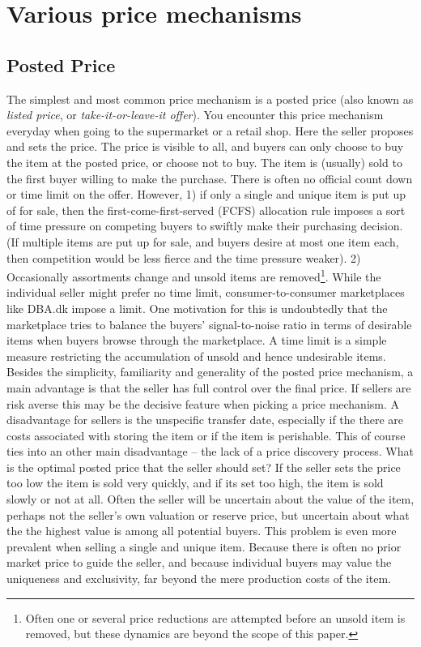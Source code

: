 \documentclass[a4paper,12pt]{article}
\begin{document}
	\section{Various price mechanisms}

	\subsection{Posted Price}
	The simplest and most common price mechanism is a posted price (also known as {\it listed price}, or {\it take-it-or-leave-it offer}). You encounter this price mechanism everyday when going to the supermarket or a retail shop. Here the seller proposes and sets the price. The price is visible to all, and buyers can only choose to buy the item at the posted price, or choose not to buy. The item is (usually) sold to the first buyer willing to make the purchase. There is often no official count down or time limit on the offer. However, 1) if only a single and unique item is put up of for sale, then the first-come-first-served (FCFS) allocation rule imposes a sort of time pressure on competing buyers to swiftly make their purchasing decision. (If multiple items are put up for sale, and buyers desire at most one item each, then competition would be less fierce and the time pressure weaker). 2) Occasionally assortments change and unsold items are removed\footnote{\label{footnote:price_reduction}Often one or several price reductions are attempted before an unsold item is removed, but these dynamics are beyond the scope of this paper.}. While the individual seller might prefer no time limit, consumer-to-consumer marketplaces like DBA.dk impose a limit. One motivation for this is undoubtedly that the marketplace tries to balance the buyers' signal-to-noise ratio in terms of desirable items when buyers browse through the marketplace. A time limit is a simple measure restricting the accumulation of unsold and hence undesirable items. Besides the simplicity, familiarity and generality of the posted price mechanism, a main advantage is that the seller has full control over the final price. If sellers are risk averse this may be the decisive feature when picking a price mechanism. A disadvantage for sellers is the unspecific transfer date, especially if the there are costs associated with storing the item or if the item is perishable. This of course ties into an other main disadvantage -- the lack of a price discovery process. What is the optimal posted price that the seller should set? If the seller sets the price too low the item is sold very quickly, and if its set too high, the item is sold slowly or not at all. Often the seller will be uncertain about the value of the item, perhaps not the seller's own valuation or reserve price, but uncertain about what the the highest value is among all potential buyers. This problem is even more prevalent when selling a single and unique item. Because there is often no prior market price to guide the seller, and because individual buyers may value the uniqueness and exclusivity, far beyond the mere production costs of the item.
\end{document}
